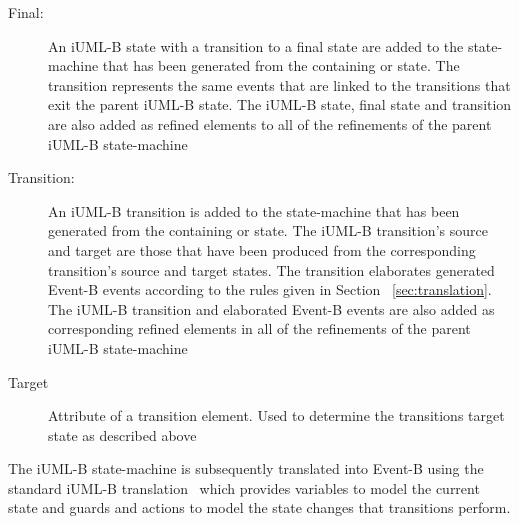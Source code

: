 \begin{description}
\item[Final:] An iUML-B state with a transition to a final state are added to the state-machine that has been generated from the containing \SCXML or state. The transition represents the same events that are linked to the transitions that exit the parent iUML-B state. The iUML-B state, final state and transition are also added as refined elements to all of the refinements of the parent iUML-B state-machine

\item[Transition:] An iUML-B transition is added to the state-machine that has been generated from the containing \SCXML or state. The iUML-B transition’s source and target are those that have been produced from the corresponding \SCXML transition’s source and target states. The transition elaborates generated Event-B events according to the rules given in Section ~\ref{sec:translation}. The iUML-B transition and elaborated Event-B events are also added as corresponding refined elements in all of the refinements of the parent iUML-B state-machine

\item[Target] Attribute of a transition element. Used to determine the transitions target state as described above
\end{description}

The iUML-B state-machine is subsequently translated into Event-B using the standard iUML-B translation~\cite{snook14:_b_statem} which provides variables to model the current state and guards and actions to model the state changes that transitions perform.


